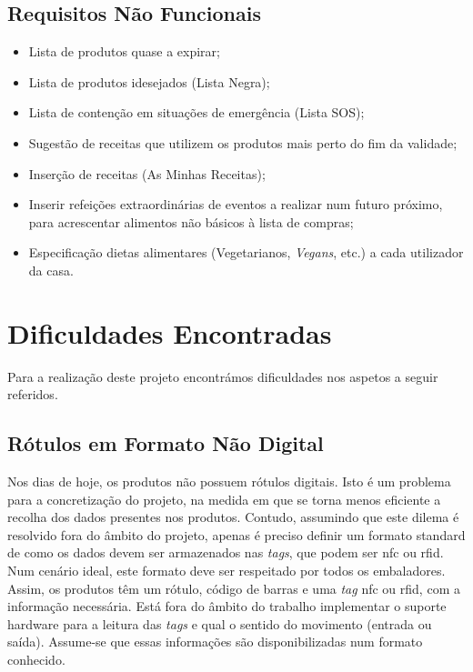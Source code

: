 \subsection{Requisitos Não Funcionais}
\begin{itemize}
	\item Lista de produtos quase a expirar;
	\item Lista de produtos idesejados (Lista Negra);
	\item Lista de contenção em situações de emergência (Lista SOS);
	\item Sugestão de receitas que utilizem os produtos mais perto do fim da validade;
	\item Inserção de receitas (As Minhas Receitas);
	\item Inserir refeições extraordinárias de eventos a realizar num futuro próximo, para acrescentar alimentos não básicos à lista de compras;
	\item Especificação dietas alimentares (Vegetarianos, \textit{Vegans}, etc.) a cada utilizador da casa.
\end{itemize}


%
%
\section{Dificuldades Encontradas} \label{sec23}

Para a realização deste projeto encontrámos dificuldades nos aspetos a seguir referidos.

\subsection{Rótulos em Formato Não Digital}

Nos dias de hoje, os produtos não possuem rótulos digitais. Isto é um problema para a concretização do projeto, na medida em que se torna menos eficiente a recolha dos dados presentes nos produtos. Contudo, assumindo que este dilema é resolvido fora do âmbito do projeto, apenas é preciso definir um formato standard de como os dados devem ser armazenados nas \textit{tags}, que podem ser \acrshort{nfc} ou \acrshort{rfid}. Num cenário ideal, este formato deve ser respeitado por todos os embaladores. Assim, os produtos têm um rótulo, código de barras e uma \textit{tag} \acrshort{nfc} ou \acrshort{rfid}, com a informação necessária. Está fora do âmbito do trabalho implementar o suporte hardware para a leitura das \textit{tags} e qual o sentido do movimento (entrada ou saída). Assume-se que essas informações são disponibilizadas num formato conhecido. 


